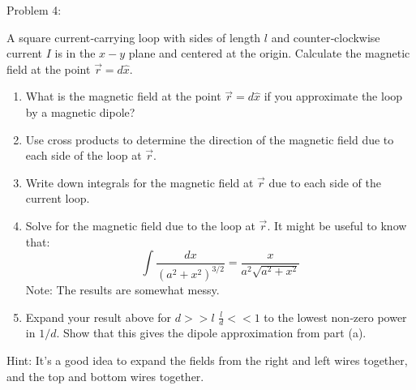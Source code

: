 \begin{Problem}{Problem 4:}
{
A square current‐carrying loop with sides of length $l$ and counter‐clockwise current $I$ is in the $x-y$ plane and centered at the origin. Calculate the magnetic field at the point $\vec{r} = d \hat{x}$.
\begin{enumerate}[label=(\alph*)]
\item What is the magnetic field at the point $\vec{r} = d \hat{x}$ if you approximate the loop by a magnetic dipole?
\item Use cross products to determine the direction of the magnetic field due to each side of the loop at $\vec{r}$.
\item Write down integrals for the magnetic field at $\vec{r}$ due to each side of the current loop.
\item Solve for the magnetic field due to the loop at $\vec{r}$. It might be useful to know that:
\begin{equation*}
\int \frac{dx}{(a^{2}+x^{2})^{3/2}} = \frac{x}{a^{2}\sqrt{a^{2}+x^{2}}}
\end{equation*}
Note: The results are somewhat messy.
\item Expand your result above for $d >> l$ $\frac{l}{d} << 1$ to the lowest non‐zero power in $1/d$. Show that this gives the dipole approximation from part (a).
\end{enumerate}
Hint: It’s a good idea to expand the fields from the right and left wires together, and the top and bottom wires together.
}
\end{Problem}
